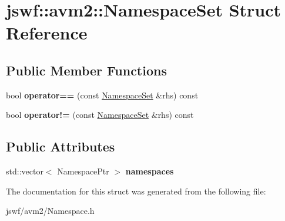 \hypertarget{structjswf_1_1avm2_1_1_namespace_set}{\section{jswf\+:\+:avm2\+:\+:Namespace\+Set Struct Reference}
\label{structjswf_1_1avm2_1_1_namespace_set}
}
\subsection*{Public Member Functions}
\begin{DoxyCompactItemize}
\item 
\hypertarget{structjswf_1_1avm2_1_1_namespace_set_a3701a3ce565076949258e7e3fb29c994}{bool {\bfseries operator==} (const \hyperlink{structjswf_1_1avm2_1_1_namespace_set}{Namespace\+Set} \&rhs) const }\label{structjswf_1_1avm2_1_1_namespace_set_a3701a3ce565076949258e7e3fb29c994}

\item 
\hypertarget{structjswf_1_1avm2_1_1_namespace_set_af889b4a06bb318fe7c77db5cfb35a2d8}{bool {\bfseries operator!=} (const \hyperlink{structjswf_1_1avm2_1_1_namespace_set}{Namespace\+Set} \&rhs) const }\label{structjswf_1_1avm2_1_1_namespace_set_af889b4a06bb318fe7c77db5cfb35a2d8}

\end{DoxyCompactItemize}
\subsection*{Public Attributes}
\begin{DoxyCompactItemize}
\item 
\hypertarget{structjswf_1_1avm2_1_1_namespace_set_a16072c17ace3c487a85b47494c3050dc}{std\+::vector$<$ Namespace\+Ptr $>$ {\bfseries namespaces}}\label{structjswf_1_1avm2_1_1_namespace_set_a16072c17ace3c487a85b47494c3050dc}

\end{DoxyCompactItemize}


The documentation for this struct was generated from the following file\+:\begin{DoxyCompactItemize}
\item 
jswf/avm2/Namespace.\+h\end{DoxyCompactItemize}
